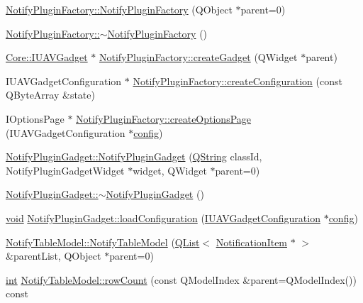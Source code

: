 \begin{DoxyCompactItemize}
\item 
\hyperlink{group__notifyplugin_ga3c91b1f9c5a354b8d5886dd3cff94126}{Notify\-Plugin\-Factory\-::\-Notify\-Plugin\-Factory} (Q\-Object $\ast$parent=0)
\item 
\hyperlink{group__notifyplugin_ga312b0e9ce81892b5388bb21c4f4c426a}{Notify\-Plugin\-Factory\-::$\sim$\-Notify\-Plugin\-Factory} ()
\item 
\hyperlink{class_core_1_1_i_u_a_v_gadget}{Core\-::\-I\-U\-A\-V\-Gadget} $\ast$ \hyperlink{group__notifyplugin_gaf83c2c3d9f1f2adfa2629f31821c012e}{Notify\-Plugin\-Factory\-::create\-Gadget} (Q\-Widget $\ast$parent)
\item 
I\-U\-A\-V\-Gadget\-Configuration $\ast$ \hyperlink{group__notifyplugin_gade4f4f78125740032a0bd6d3e920d131}{Notify\-Plugin\-Factory\-::create\-Configuration} (const Q\-Byte\-Array \&state)
\item 
I\-Options\-Page $\ast$ \hyperlink{group__notifyplugin_ga04b86d8ce232e043459331bd3ab5d05d}{Notify\-Plugin\-Factory\-::create\-Options\-Page} (I\-U\-A\-V\-Gadget\-Configuration $\ast$\hyperlink{deflate_8c_a4473b5227787415097004fd39f55185e}{config})
\item 
\hyperlink{group__notifyplugin_ga2550c9c08be7f6731350a3be6fbaba4a}{Notify\-Plugin\-Gadget\-::\-Notify\-Plugin\-Gadget} (\hyperlink{group___u_a_v_objects_plugin_gab9d252f49c333c94a72f97ce3105a32d}{Q\-String} class\-Id, Notify\-Plugin\-Gadget\-Widget $\ast$widget, Q\-Widget $\ast$parent=0)
\item 
\hyperlink{group__notifyplugin_ga2b03f730db4ecb4673e46a323c9cbc45}{Notify\-Plugin\-Gadget\-::$\sim$\-Notify\-Plugin\-Gadget} ()
\item 
\hyperlink{group___u_a_v_objects_plugin_ga444cf2ff3f0ecbe028adce838d373f5c}{void} \hyperlink{group__notifyplugin_gad7b898c97fa3c65ea707934881f356e5}{Notify\-Plugin\-Gadget\-::load\-Configuration} (\hyperlink{class_core_1_1_i_u_a_v_gadget_configuration}{I\-U\-A\-V\-Gadget\-Configuration} $\ast$\hyperlink{deflate_8c_a4473b5227787415097004fd39f55185e}{config})
\item 
\hyperlink{group__notifyplugin_ga7c99d26f6ccdab1cb80b8cfdfaa9d814}{Notify\-Table\-Model\-::\-Notify\-Table\-Model} (\hyperlink{class_q_list}{Q\-List}$<$ \hyperlink{class_notification_item}{Notification\-Item} $\ast$ $>$ \&parent\-List, Q\-Object $\ast$parent=0)
\item 
\hyperlink{ioapi_8h_a787fa3cf048117ba7123753c1e74fcd6}{int} \hyperlink{group__notifyplugin_ga2bd35c3c39b4a7c057e00786a7ece129}{Notify\-Table\-Model\-::row\-Count} (const Q\-Model\-Index \&parent=Q\-Model\-Index()) const 

\end{DoxyCompactItemize}
